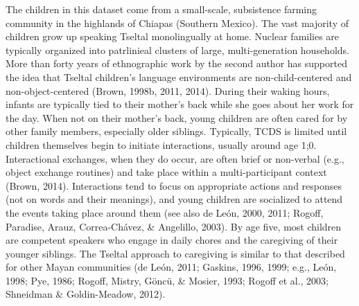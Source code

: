 \documentclass[floatsintext,man]{apa6}
\theoremstyle{definition}
\theoremstyle{definition}
\theoremstyle{definition}
\theoremstyle{remark}
\begin{document}
The children in this dataset come from a small-scale, subsistence
farming community in the highlands of Chiapas (Southern Mexico). The
vast majority of children grow up speaking Tseltal monolingually at
home. Nuclear families are typically organized into patrlinieal clusters
of large, multi-generation households. More than forty years of
ethnographic work by the second author has supported the idea that
Tseltal children's language environments are non-child-centered and
non-object-centered (Brown, 1998b, 2011, 2014). During their waking
hours, infants are typically tied to their mother's back while she goes
about her work for the day. When not on their mother's back, young
children are often cared for by other family members, especially older
siblings. Typically, TCDS is limited until children themselves begin to
initiate interactions, usually around age 1;0. Interactional exchanges,
when they do occur, are often brief or non-verbal (e.g., object exchange
routines) and take place within a multi-participant context (Brown,
2014). Interactions tend to focus on appropriate actions and responses
(not on words and their meanings), and young children are socialized to
attend the events taking place around them (see also de León, 2000,
2011; Rogoff, Paradise, Arauz, Correa-Chávez, \& Angelillo, 2003). By
age five, most children are competent speakers who engage in daily
chores and the caregiving of their younger siblings. The Tseltal
approach to caregiving is similar to that described for other Mayan
communities (de León, 2011; Gaskins, 1996, 1999; e.g., León, 1998; Pye,
1986; Rogoff, Mistry, Göncü, \& Mosier, 1993; Rogoff et al., 2003;
Shneidman \& Goldin-Meadow, 2012).
\end{document}
